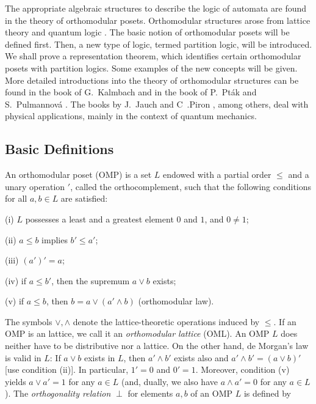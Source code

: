 The appropriate algebraic structures to describe the logic of automata
are found in the theory of orthomodular posets.
Orthomodular structures arose from lattice
theory
\cite{bhlat,graetzer,szasz}
and quantum logic \cite{birkhoff,giuntini-91}.
The basic notion of orthomodular posets will be defined first.
Then, a new type of logic, termed partition logic, will be introduced.
We shall prove a representation theorem, which identifies certain
orthomodular posets with partition logics.
Some examples of the new concepts will be given.
More detailed introductions into the theory of orthomodular structures
can be found in the book of G.~Kalmbach \cite{kalmbach}
and in the book of P.~Pt\'ak and S.~Pulmannov\'a \cite{ptak}.
The books by J.~Jauch \cite{jauch} and C~.Piron \cite{piron}, among
others, deal with
physical applications,
mainly in the context of quantum mechanics.

\subsection{Basic Definitions}

\begin{defin}
\label{OMP}
An orthomodular poset (OMP) is a set $L$ endowed with
a partial order $\le$ and a unary operation $'$,
called the orthocomplement, such that
the following conditions for all $a,b \in L$ are satisfied:

(i) $L$ possesses a least and a greatest element $0$ and $1$,
 and $0\neq1$;

(ii) $a \leq b$ implies $b'\leq a'$;

(iii) $(a')' = a$;

(iv) if $a \leq b'$, then the supremum $a\vee b$ exists;

(v) if $a\leq b$, then $b=a\vee (a' \wedge b)$
(orthomodular law).
\end{defin}

The symbols $\vee, \wedge$ denote the lattice-theoretic operations induced by
$\le$.
If an OMP is an lattice, we call it an {\em orthomodular lattice}
(OML).
An OMP $L$ does neither have to be distributive nor a lattice.
On the other hand, de Morgan's law is valid in $L$:
If $a \vee b$ exists in $L$, then $a' \wedge b'$ exists also and
$a' \wedge b' = (a \vee b)'$ [use condition (ii)].
In particular, $1' = 0$ and $0' = 1$.
Moreover, condition (v) yields $a \vee a' = 1$ for any $a \in L$
(and, dually, we also have $a \wedge a' = 0$ for any $a \in L$).
The {\em orthogonality relation} $\perp$ for elements $a,b$ of an OMP $L$ is
defined by

